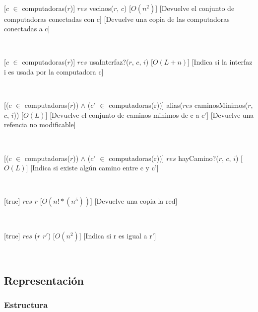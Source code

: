   ~

  [$c$ $\in$ computadoras($r$)]
  {$res$ \igobs vecinos($r$, $c$)}
  [$O(n^2)$]
  [Devuelve el conjunto de computadoras conectadas con c]
  [Devuelve una copia de las computadoras conectadas a c]

  ~

  [$c$ $\in$ computadoras($r$)]
  {$res$ \igobs usaInterfaz?($r$, $c$, $i$)}
  [$O(L + n)$]
  [Indica si la interfaz i es usada por la computadora c]

  ~

  [($c$ $\in$ computadoras($r$)) $\land$ ($c'$ $\in$ computadoras(r))]
  {alias($res$ \igobs caminosMinimos($r$, $c$, $i$))}
  [$O(L)$]
  [Devuelve el conjunto de caminos minimos de c a c']
  [Devuelve una refencia no modificable]


  ~

  [($c$ $\in$ computadoras($r$)) $\land$ ($c'$ $\in$ computadoras(r))]
  {$res$ \igobs hayCamino?($r$, $c$, $i$)}
  [$O(L)$]
  [Indica si existe algún camino entre c y c']

  ~

  [true]
  {$res$ \igobs $r$}
  [$O(n!*(n^5))$]
  [Devuelve una copia la red]

  ~

  [true]
  {$res$ \igobs ($r$ \igobs $r'$)}
  [$O(n^2)$]
  [Indica si r es igual a r']

  ~


\subsection{Representación}

  \subsubsection{Estructura}

